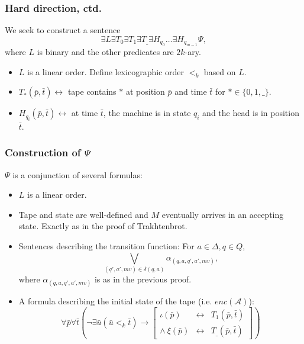\documentclass{beamer}
\newcommand{\A}{\mathcal{A}}
\begin{document}
\begin{frame}
	\frametitle{Hard direction, ctd.}
	We seek to construct a sentence
	\begin{equation*}
	∃L ∃T_0 ∃T_1 ∃T_{\_} ∃H_{q_0} … ∃H_{q_{m-1}} Ψ,
	\end{equation*}
	where $L$ is binary and the other predicates are $2k$-ary.
	
	\medskip
	
	\begin{itemize}
	\item<2-> $L$ is a linear order. Define lexicographic order $<_k$ based on $L$.
	\item<3-> $T_{*}(\bar{p}, \bar{t}) \leftrightarrow$ tape contains $*$ at position $\bar{p}$ and time $\bar{t}$ for $* ∈ \{0, 1, \_\}$.
	\item<4-> $H_{q_i}(\bar{p},\bar{t}) \leftrightarrow$ at time $\bar{t}$, the machine is in state $q_{i}$ and the head is in position $\bar{t}$.
	\end{itemize}
\end{frame}

\begin{frame}
	\frametitle{Construction of $Ψ$}
	$Ψ$ is a conjunction of several formulas:
	\begin{itemize}
		\item<2-> $L$ is a linear order.
		\item<3-> Tape and state are well-defined and $M$ eventually arrives in an accepting state. Exactly as in the proof of Trakhtenbrot.
		\item<4-> Sentences describing the transition function: For $a ∈ Δ, q ∈ Q$,
		\begin{equation*}
		\bigvee_{(q',a',mv) ∈ δ(q,a)} α_{(q,a,q',a',mv)},
		\end{equation*}
		where $α_{(q,a,q',a',mv)}$ is as in the previous proof.
		\item<5-> A formula describing the initial state of the tape (i.e. $enc(\A)$):
		\begin{equation*}
		∀\bar{p}∀\bar{t}\left(¬∃\bar{u} (\bar{u} <_k \bar{t}) → \left[
		\begin{array}{rcl}
		ι(\bar{p})&\leftrightarrow&T_1(\bar{p},\bar{t})\\
		∧\ ξ(\bar{p})&\leftrightarrow&T_{\_}(\bar{p},\bar{t})
		\end{array}		
		\right]\right)
		\end{equation*}
	\end{itemize}
\end{frame}
\end{document}
